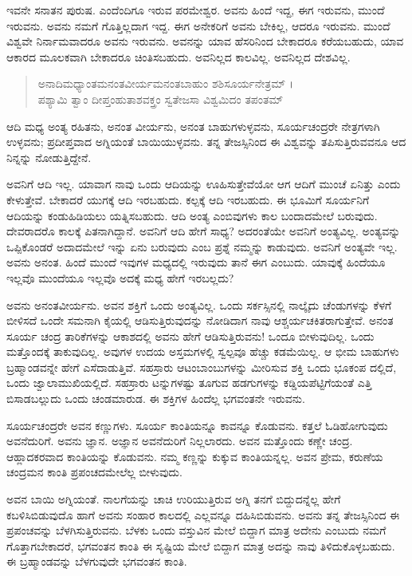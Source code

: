 ಇವನೇ ಸನಾತನ ಪುರುಷ. ಎಂದೆಂದಿಗೂ ಇರುವ ಪರಮೇಶ್ವರ. ಅವನು ಹಿಂದೆ ಇದ್ದ, ಈಗ ಇರುವನು, ಮುಂದೆ ಇರುವನು. ಅವನು ನಮಗೆ ಗೊತ್ತಿಲ್ಲದಾಗ ಇದ್ದ. ಈಗ ಅನೇಕರಿಗೆ ಅವನು ಬೇಕಿಲ್ಲ, ಆದರೂ ಇರುವನು. ಮುಂದೆ ವಿಶ್ವವೇ ನಿರ್ನಾಮವಾದರೂ ಅವನು ಇರುವನು. ಅವನನ್ನು ಯಾವ ಹೆಸರಿನಿಂದ ಬೇಕಾದರೂ ಕರೆಯಬಹುದು, ಯಾವ ಆಕಾರದ ಮೂಲಕವಾಗಿ ಬೇಕಾದರೂ ಚಿಂತಿಸಬಹುದು. ಅವನಿಲ್ಲದ ಕಾಲವಿಲ್ಲ. ಅವನಿಲ್ಲದ ದೇಶವಿಲ್ಲ.

\begin{verse}
ಅನಾದಿಮಧ್ಯಾಂತಮನಂತವೀರ್ಯಮನಂತಬಾಹುಂ ಶಶಿಸೂರ್ಯನೇತ್ರಮ್ ।\\ಪಶ್ಯಾಮಿ ತ್ವಾಂ ದೀಪ್ತಂಹುತಾಶವಕ್ತ್ರಂ ಸ್ವತೇಜಸಾ ವಿಶ್ವಮಿದಂ ತಪಂತಮ್ 
\end{verse}

{\small ಆದಿ ಮಧ್ಯ ಅಂತ್ಯ ರಹಿತನು, ಅನಂತ ವೀರ್ಯನು, ಅನಂತ ಬಾಹುಗಳುಳ್ಳವನು, ಸೂರ್ಯಚಂದ್ರರೇ ನೇತ್ರಗಳಾಗಿ ಉಳ್ಳವನು; ಪ್ರದೀಪ್ತವಾದ ಅಗ್ನಿಯಂತೆ ಬಾಯಿಯುಳ್ಳವನು. ತನ್ನ ತೇಜಸ್ಸಿನಿಂದ ಈ ವಿಶ್ವವನ್ನು ತಪಿಸುತ್ತಿರುವವನೂ ಆದ ನಿನ್ನನ್ನು ನೋಡುತ್ತಿದ್ದೇನೆ.}

ಅವನಿಗೆ ಆದಿ ಇಲ್ಲ. ಯಾವಾಗ ನಾವು ಒಂದು ಆದಿಯನ್ನು ಊಹಿಸುತ್ತೇವೆಯೋ ಆಗ ಆದಿಗೆ ಮುಂಚೆ ಏನಿತ್ತು ಎಂದು ಕೇಳುತ್ತೇವೆ. ಬೇಕಾದರೆ ಯುಗಕ್ಕೆ ಆದಿ ಇರಬಹುದು. ಕಲ್ಪಕ್ಕೆ ಆದಿ ಇರಬಹುದು. ಈ ಭೂಮಿಗೆ ಸೂರ್ಯನಿಗೆ ಆದಿಯನ್ನು ಕಂಡುಹಿಡಿಯಲು ಯತ್ನಿಸಬಹುದು. ಆದಿ ಅಂತ್ಯ ಎಂಬಿವುಗಳು ಕಾಲ ಬಂದಾದಮೇಲೆ ಬರುವುದು. ದೇವರಾದರೊ ಕಾಲಕ್ಕೆ ಪಿತನಾಗಿದ್ದಾನೆ. ಅವನಿಗೆ ಆದಿ ಹೇಗೆ ಸಾಧ್ಯ? ಅದರಂತೆಯೇ ಅವನಿಗೆ ಅಂತ್ಯವಿಲ್ಲ. ಅಂತ್ಯವನ್ನು ಒಪ್ಪಿಕೊಂಡರೆ ಅದಾದಮೇಲೆ ಇನ್ನು ಏನು ಬರುವುದು ಎಂಬ ಪ್ರಶ್ನೆ ನಮ್ಮನ್ನು ಕಾಡುವುದು. ಅವನಿಗೆ ಅಂತ್ಯವೇ ಇಲ್ಲ. ಅವನು ಅನಂತ. ಹಿಂದೆ ಮುಂದೆ ಇವುಗಳ ಮಧ್ಯದಲ್ಲಿ ಇರುವುದು ತಾನೆ ಈಗ ಎಂಬುದು. ಯಾವುಕ್ಕೆ ಹಿಂದೆಯೂ ಇಲ್ಲವೊ ಮುಂದೆಯೂ ಇಲ್ಲವೊ ಅದಕ್ಕೆ ಮಧ್ಯ ಹೇಗೆ ಇರಬಲ್ಲದು?

ಅವನು ಅನಂತವೀರ್ಯನು. ಅವನ ಶಕ್ತಿಗೆ ಒಂದು ಅಂತ್ಯವಿಲ್ಲ. ಒಂದು ಸರ್ಕಸ್ಸಿನಲ್ಲಿ ನಾಲ್ಕೈದು ಚೆಂಡುಗಳನ್ನು ಕೆಳಗೆ ಬೀಳಿಸದೆ ಒಂದೇ ಸಮನಾಗಿ ಕೈಯಲ್ಲಿ ಆಡಿಸುತ್ತಿರುವುದನ್ನು ನೋಡಿದಾಗ ನಾವು ಆಶ್ಚರ್ಯಚಕಿತರಾಗುತ್ತೇವೆ. ಅನಂತ ಸೂರ್ಯ ಚಂದ್ರ ತಾರಿಕೆಗಳನ್ನು ಆಕಾಶದಲ್ಲಿ ಅವನು ಹೇಗೆ ಆಡಿಸುತ್ತಿರುವನು! ಒಂದೂ ಬೀಳುವುದಿಲ್ಲ. ಒಂದು ಮತ್ತೊಂದಕ್ಕೆ ತಾಕುವುದಿಲ್ಲ. ಅವುಗಳ ಉದಯ ಅಸ್ತಮಗಳಲ್ಲಿ ಸ್ವಲ್ಪವೂ ಹೆಚ್ಚು ಕಡಮೆಯಿಲ್ಲ. ಆ ಭೀಮ ಬಾಹುಗಳು ಬ್ರಹ್ಮಾಂಡವನ್ನೇ ಹೇಗೆ ಎಸೆದಾಡುತ್ತಿವೆ. ಸಹಸ್ರಾರು ಆಟಂಬಾಂಬುಗಳನ್ನು ಮೀರಿಸುವ ಶಕ್ತಿ ಒಂದು ಭೂಕಂಪ ದಲ್ಲಿದೆ, ಒಂದು ಜ್ವಾಲಾಮುಖಿಯಲ್ಲಿದೆ. ಸಹಸ್ರಾರು ಟನ್ನುಗಳಷ್ಟು ತೂಗುವ ಹಡಗುಗಳನ್ನು ಕಡ್ಡಿಯಪೆಟ್ಟಿಗೆಯಂತೆ ಎತ್ತಿ ಬಿಸಾಡಬಲ್ಲುದು ಒಂದು ಚಂಡಮಾರುಡ. ಈ ಶಕ್ತಿಗಳ ಹಿಂದೆಲ್ಲ ಭಗವಂತನೇ ಇರುವನು.

ಸೂರ್ಯಚಂದ್ರರೇ ಅವನ ಕಣ್ಣುಗಳು. ಸೂರ್ಯ ಕಾಂತಿಯನ್ನೂ ಕಾವನ್ನೂ ಕೊಡುವನು. ಕತ್ತಲೆ ಓಡಿಹೋಗುವುದು ಅವನೆದುರಿಗೆ. ಅವನು ಜ್ಞಾನ. ಅಜ್ಞಾನ ಅವನೆದುರಿಗೆ ನಿಲ್ಲಲಾರದು. ಅವನ ಮತ್ತೊಂದು ಕಣ್ಣೇ ಚಂದ್ರ. ಆಹ್ಲಾದಕರವಾದ ಕಾಂತಿಯನ್ನು ಕೊಡುವನು. ನಮ್ಮ ಕಣ್ಣನ್ನು ಕುಕ್ಕುವ ಕಾಂತಿಯನ್ನಲ್ಲ. ಅವನ ಪ್ರೇಮ, ಕರುಣೆಯ ಚಂದ್ರಮನ ಕಾಂತಿ ಪ್ರಪಂಚದಮೇಲೆಲ್ಲ ಬೀಳುವುದು.

ಅವನ ಬಾಯಿ ಅಗ್ನಿಯಂತೆ. ನಾಲಗೆಯನ್ನು ಚಾಚಿ ಉರಿಯುತ್ತಿರುವ ಅಗ್ನಿ ತನಗೆ ಬಿದ್ದುದನ್ನೆಲ್ಲ ಹೇಗೆ ಕಬಳಿಸಿಬಿಡುವುದೊ ಹಾಗೆ ಅವನು ಸಂಹಾರ ಕಾಲದಲ್ಲಿ ಎಲ್ಲವನ್ನೂ ದಹಿಸಿಬಿಡುವನು. ಅವನು ತನ್ನ ತೇಜಸ್ಸಿನಿಂದ ಈ ಪ್ರಪಂಚವನ್ನು ಬೆಳಗಿಸುತ್ತಿರುವನು. ಬೆಳಕು ಒಂದು ವಸ್ತುವಿನ ಮೇಲೆ ಬಿದ್ದಾಗ ಮಾತ್ರ ಅದೇನು ಎಂಬುದು ನಮಗೆ ಗೊತ್ತಾಗಬೇಕಾದರೆ, ಭಗವಂತನ ಕಾಂತಿ ಈ ಸೃಷ್ಟಿಯ ಮೇಲೆ ಬಿದ್ದಾಗ ಮಾತ್ರ ಅದನ್ನು ನಾವು ತಿಳಿದುಕೊಳ್ಳಬಹುದು. ಈ ಬ್ರಹ್ಮಾಂಡವನ್ನು ಬೆಳಗುವುದೇ ಭಗವಂತನ ಕಾಂತಿ.

